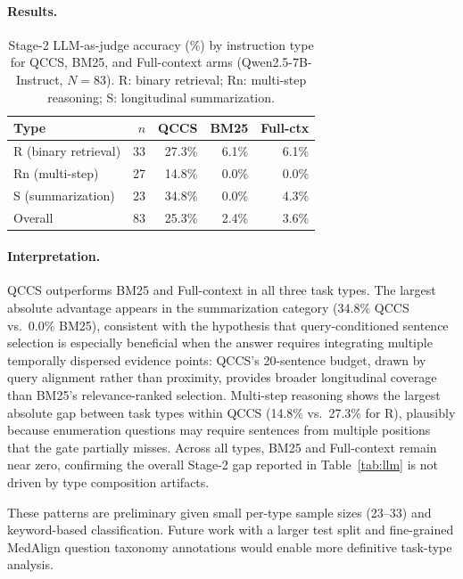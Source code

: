\documentclass{article}
\begin{document}
\paragraph{Results.}

\begin{table}[H]
\centering
\caption{Stage-2 LLM-as-judge accuracy (\%) by instruction type for QCCS,
  BM25, and Full-context arms (Qwen2.5-7B-Instruct, $N{=}83$).
  R: binary retrieval; Rn: multi-step reasoning; S: longitudinal summarization.}
\label{tab:tasktype}
\small
\begin{tabular}{@{}lrrrr@{}}
\toprule
Type & $n$ & QCCS & BM25 & Full-ctx \\
\midrule
R (binary retrieval)     & 33 & 27.3\% & 6.1\% & 6.1\% \\
Rn (multi-step)          & 27 & 14.8\% & 0.0\% & 0.0\% \\
S (summarization)        & 23 & 34.8\% & 0.0\% & 4.3\% \\
\midrule
Overall                  & 83 & 25.3\% & 2.4\% & 3.6\% \\
\bottomrule
\end{tabular}
\end{table}

\paragraph{Interpretation.}
QCCS outperforms BM25 and Full-context in all three task types.
The largest absolute advantage appears in the summarization category
(34.8\% QCCS vs.\ 0.0\% BM25), consistent with the hypothesis that
query-conditioned sentence selection is especially beneficial when the
answer requires integrating multiple temporally dispersed evidence points:
QCCS's 20-sentence budget, drawn by query alignment rather than proximity,
provides broader longitudinal coverage than BM25's relevance-ranked selection.
Multi-step reasoning shows the largest absolute gap between task types within
QCCS (14.8\% vs.\ 27.3\% for R), plausibly because enumeration questions may
require sentences from multiple positions that the gate partially misses.
Across all types, BM25 and Full-context remain near zero, confirming the
overall Stage-2 gap reported in Table~\ref{tab:llm} is not driven by type
composition artifacts.

These patterns are preliminary given small per-type sample sizes (23--33)
and keyword-based classification. Future work with a larger test split and
fine-grained MedAlign question taxonomy annotations would enable more
definitive task-type analysis.
\end{document}
